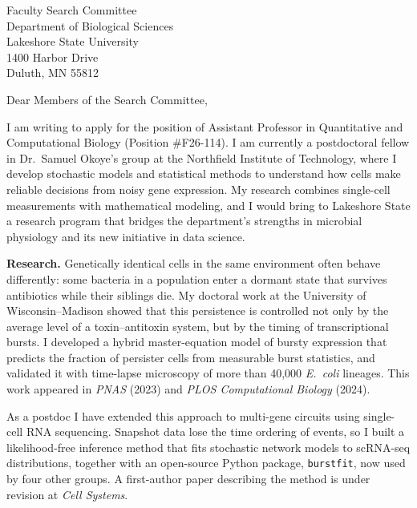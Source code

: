 \documentclass[11pt]{letter}
\date{October 7, 2026}
\begin{document}
\begin{letter}{Faculty Search Committee\\
  Department of Biological Sciences\\
  Lakeshore State University\\
  1400 Harbor Drive\\
  Duluth, MN 55812}

\opening{Dear Members of the Search Committee,}

I am writing to apply for the position of Assistant Professor in Quantitative and Computational Biology (Position \#F26-114). I am currently a postdoctoral fellow in Dr.~Samuel Okoye's group at the Northfield Institute of Technology, where I develop stochastic models and statistical methods to understand how cells make reliable decisions from noisy gene expression. My research combines single-cell measurements with mathematical modeling, and I would bring to Lakeshore State a research program that bridges the department's strengths in microbial physiology and its new initiative in data science.

\textbf{Research.} Genetically identical cells in the same environment often behave differently: some bacteria in a population enter a dormant state that survives antibiotics while their siblings die. My doctoral work at the University of Wisconsin--Madison showed that this persistence is controlled not only by the average level of a toxin--antitoxin system, but by the timing of transcriptional bursts. I developed a hybrid master-equation model of bursty expression that predicts the fraction of persister cells from measurable burst statistics, and validated it with time-lapse microscopy of more than 40,000 \emph{E.~coli} lineages. This work appeared in \emph{PNAS} (2023) and \emph{PLOS Computational Biology} (2024).

As a postdoc I have extended this approach to multi-gene circuits using single-cell RNA sequencing. Snapshot data lose the time ordering of events, so I built a likelihood-free inference method that fits stochastic network models to scRNA-seq distributions, together with an open-source Python package, \texttt{burstfit}, now used by four other groups. A first-author paper describing the method is under revision at \emph{Cell Systems}.


\end{letter}
\end{document}
